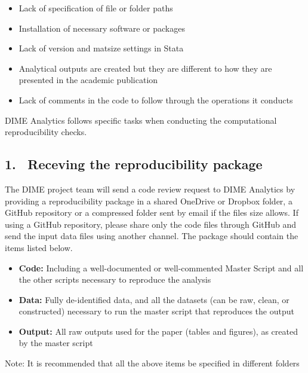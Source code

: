 \begin{fullwidth}
	\bigskip

	\begin{itemize}
		\setlength\itemsep{-0.1em}
		\item Lack of specification of file or folder paths
		\item Installation of necessary software or packages
		\item Lack of version and matsize settings in Stata
		\item Analytical outputs are created but they are different to how they are presented in the academic publication
		\item Lack of comments in the code to follow through the operations it conducts
	\end{itemize}

	DIME Analytics follows specific tasks when conducting the computational reproducibility checks.

	\subsection{1. \, Receving the reproducibility package}

	The DIME project team will send a code review request to DIME Analytics by providing a reproducibility package in a shared OneDrive or Dropbox folder, a GitHub repository or a compressed folder sent by email if the files size allows. If using a GitHub repository, please share only the code files through GitHub and send the input data files using another channel. The package should contain the items listed below.

	\bigskip

	\begin{itemize}
		\setlength\itemsep{-0.1em}
		\item \textbf{Code:} Including a well-documented or well-commented Master Script and all the other scripts necessary to reproduce the analysis
		\item \textbf{Data:} Fully de-identified data, and all the datasets (can be raw, clean, or constructed) necessary to run the master script that reproduces the output
		\item \textbf{Output:} All raw outputs used for the paper (tables and figures), as created by the master script
	\end{itemize}

	\bigskip

	Note: It is recommended that all the above items be specified in different folders


\end{fullwidth}
